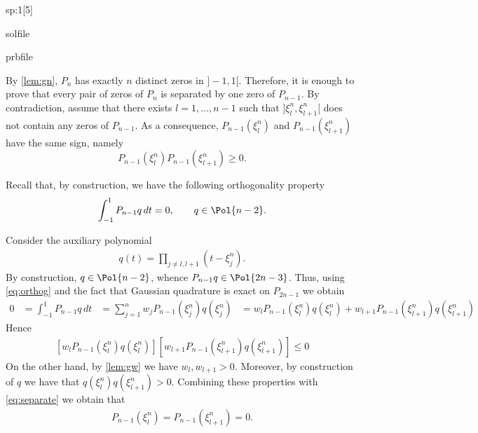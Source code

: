 \begin{samproblem}
\begin{subproblem}{sp:1}[5]
  \begin{samwriteprbpart}{solfile}
    \begin{writeverbatim}{prbfile}
      \begin{samsolution}
        By \cref{lem:gn}, $P_n$ has exactly $n$ distinct zeros in $]-1,1[$. Therefore, it is enough to prove that every pair 
        of zeros of $P_n$ is separated by one zero of $P_{n-1}$. By contradiction, assume that there exists $l=1,\dots,n-1$ 
        such that $]\xi^n_l,\xi_{l+1}^n[$ does not contain any zeros of $P_{n-1}$. As a consequence, $P_{n-1}(\xi^n_l)$ and 
        $P_{n-1}(\xi^n_{l+1})$ have the same sign, namely
        \begin{equation}\label{eq:separate}
          P_{n-1}(\xi^n_l) P_{n-1}(\xi^n_{l+1})\ge 0.
        \end{equation}

        Recall that, by construction, we have the following orthogonality property
        \begin{equation}\label{eq:orthog}
          \int_{-1}^1P_{n-1}q\,dt=0,\qquad q\in\Pol{n-2}.
        \end{equation}

        Consider the auxiliary polynomial
        \begin{align*}
          q(t)=\prod_{j\neq l,l+1} (t-\xi^n_j).
        \end{align*}
        By construction, $q\in\Pol{n-2}$, whence $P_{n-1}q\in\Pol{2n-3}$. Thus, using \eqref{eq:orthog} and the fact that 
        Gaussian quadrature is exact on $P_{2n-1}$ we obtain
        \begin{align*}
          0 &= \int_{-1}^1P_{n-1}q\,dt 
            &= \sum_{j=1}^n w_j P_{n-1}(\xi_j^n) q(\xi^n_j) 
            &= w_l P_{n-1}(\xi_l^n) q(\xi^n_l) + w_{l+1} P_{n-1}(\xi_{l+1}^n) q(\xi^n_{l+1})
        \end{align*}
        Hence
        \begin{align*}
          \left[ w_l P_{n-1}(\xi_l^n) q(\xi^n_l) \right] \left[ w_{l+1} P_{n-1}(\xi_{l+1}^n) q(\xi^n_{l+1})\right]\le 0
        \end{align*}
        On the other hand, by \cref{lem:gw} we have $w_l ,w_{l+1}>0$. Moreover, by construction of $q$ we have that 
        $q(\xi^n_l)q(\xi^n_{l+1})>0$. Combining these properties with \eqref{eq:separate} we obtain that
        \begin{align*}
          P_{n-1}(\xi_l^n)=P_{n-1}(\xi_{l+1}^n)=0.
        \end{align*}


\end{samsolution}
\end{writeverbatim}
\end{samwriteprbpart}
\end{subproblem}
\end{samproblem}
